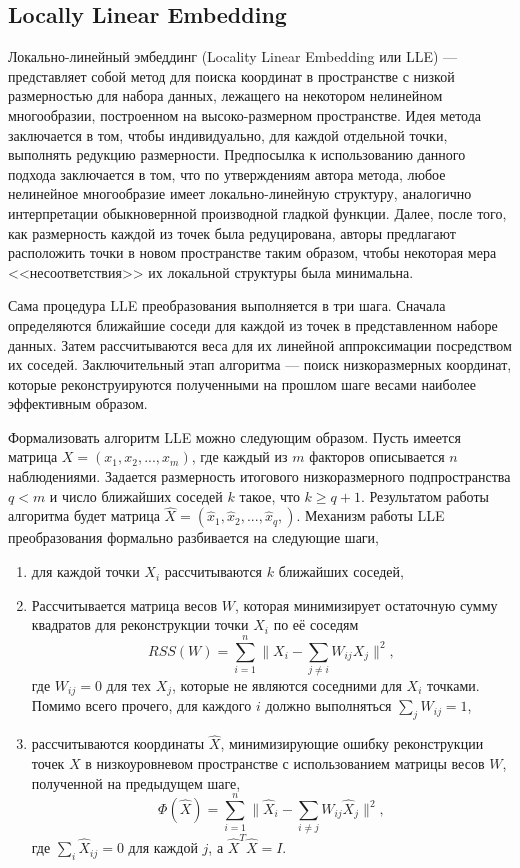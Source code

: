 \documentclass[runningheads]{llncs}
\begin{document}
\subsection{Locally Linear Embedding}
\hspace{0.4cm}
Локально-линейный эмбеддинг (Locality Linear Embedding или LLE) — представляет собой метод для поиска координат в пространстве с низкой размерностью для набора данных, лежащего на некотором нелинейном многообразии, построенном на высоко-размерном пространстве. Идея метода заключается в том, чтобы индивидуально, для каждой отдельной точки, выполнять редукцию размерности. Предпосылка к использованию данного подхода заключается в том, что по утверждениям автора метода, любое нелинейное многообразие имеет локально-линейную структуру, аналогично интерпретации обыкновернной производной гладкой функции. Далее, после того, как размерность каждой из точек была редуцирована, авторы предлагают расположить точки в новом пространстве таким образом, чтобы некоторая мера <<несоответствия>> их локальной структуры была минимальна. \par

Сама процедура LLE преобразования выполняется в три шага. Сначала определяются ближайшие соседи для каждой из точек в представленном наборе данных. Затем рассчитываются веса для их линейной аппроксимации посредством их соседей. Заключительный этап алгоритма — поиск низкоразмерных координат, которые реконструируются полученными на прошлом шаге весами наиболее эффективным образом. \par
Формализовать алгоритм LLE можно следующим образом. Пусть имеется матрица $X = (x_1, x_2, ..., x_m)$, где каждый из $m$ факторов описывается $n$ наблюдениями. Задается размерность итогового низкоразмерного подпространства $q < m$ и число ближайших соседей $k$ такое, что $k \geq q + 1$. Результатом работы алгоритма будет матрица $\hat{X} = (\hat{x}_1, \hat{x}_2, ..., \hat{x}_q, )$. Механизм работы LLE преобразования формально разбивается на следующие шаги,
\begin{enumerate}
  \item для каждой точки $X_i$ рассчитываются $k$ ближайших соседей,
  \item Рассчитывается матрица весов $W$, которая минимизирует остаточную сумму квадратов для реконструкции точки $X_i$ по её соседям
  $$RSS(W) = \sum_{i=1}^n\|X_i - \sum_{j \neq i}W_{ij}X_j\|^2,$$
  где $W_{ij} = 0$ для тех $X_j$, которые не являются соседними для $X_i$ точками. Помимо всего прочего, для каждого $i$ должно выполняться $\sum_j W_{ij} = 1$,
  \item рассчитываются координаты $\hat{X}$, минимизирующие ошибку реконструкции точек $X$ в низкоуровневом пространстве с использованием матрицы весов $W$, полученной на предыдущем шаге,
  $$\Phi(\hat{X}) = \sum_{i=1}^n\|\hat{X}_i - \sum_{i \neq j} W_{ij}\hat{X}_j\|^2,$$
  где $\sum_i\hat{X}_{ij} = 0$ для каждой $j$, а $\hat{X}^T\hat{X} = I$.
\end{enumerate}
\end{document}
